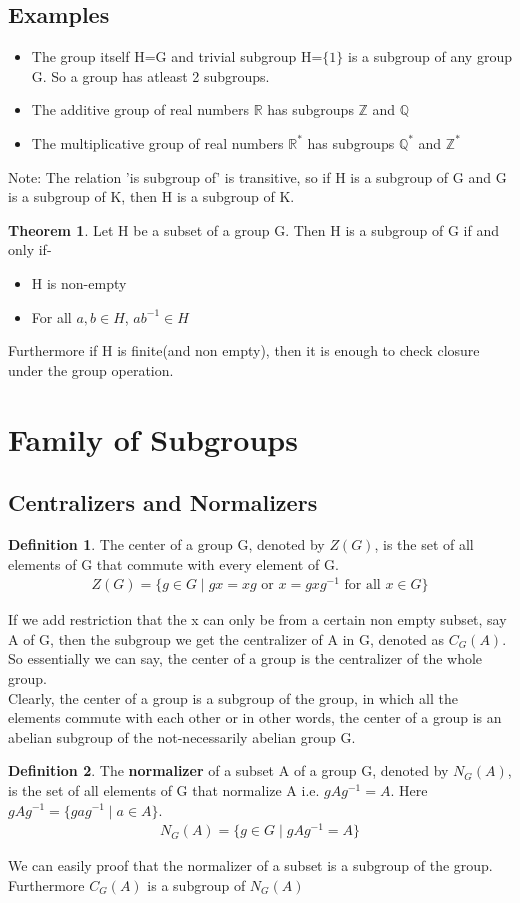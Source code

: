 \documentclass[12pt,a4paper,oneside]{report}
\theoremstyle{definition}
\newtheorem{definition}{Definition}[chapter]
\newtheorem{theorem}{Theorem}
\begin{document}
\subsection{Examples}
\begin{itemize}
  \item The group itself H=G and trivial subgroup H=$\{1\}$ is a subgroup of any group G. So a group has atleast 2 subgroups.
  \item The additive group of real numbers $\mathbb{R}$ has subgroups $\mathbb{Z}$ and $\mathbb{Q}$
  \item The multiplicative group of real numbers $\mathbb{R}^{*}$ has subgroups $\mathbb{Q}^{*}$ and $\mathbb{Z}^{*}$
\end{itemize}
Note: The relation 'is subgroup of' is transitive, so if H is a subgroup of G and G is a subgroup of K, then H is a subgroup of K.
\begin{theorem}
    Let H be a subset of a group G. Then H is a subgroup of G if and only if-
    \begin{itemize}
      \item H is non-empty
      \item For all $a, b \in H$, $ab^{-1} \in H$
    \end{itemize}
    Furthermore if H is finite(and non empty), then it is enough to check closure under the group operation.
\end{theorem}
\section{Family of Subgroups}
\subsection{Centralizers and Normalizers}
\begin{definition}
  The center of a group G, denoted by $Z(G)$, is the set of all elements of G that commute with every element of G.
  \begin{align*}
    Z(G) = \{g \in G \mid gx = xg \text{ or } x=gxg^{-1} \text{ for all } x \in G\}
  \end{align*}
\end{definition}
If we add restriction that the x can only be from a certain non empty subset, say A of G, then the subgroup we get the centralizer of A in G, denoted as $C_G(A)$. So essentially we can say, the center of a group is the centralizer of the whole group.
\\Clearly, the center of a group is a subgroup of the group, in which all the elements commute with each other or in other words, the center of a group is an abelian subgroup of the not-necessarily abelian group G.
\begin{definition}
The \textbf{normalizer} of a subset A of a group G, denoted by $N_G(A)$, is the set of all elements of G that normalize A i.e. $gAg^{-1}=A$. Here $gAg^{-1}=\{gag^{-1} \mid a \in A\}$.
  \begin{align*}
    N_G(A) = \{g \in G \mid gAg^{-1} = A\}
  \end{align*}
\end{definition}
We can easily proof that the normalizer of a subset is a subgroup of the group. Furthermore $C_G(A)$ is a subgroup of $N_G(A)$
\end{document}
